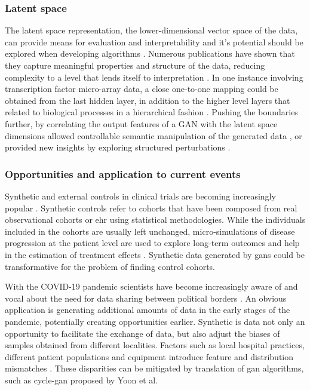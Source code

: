 \subsubsection{Latent space \label{sec:latent-space}}
The latent space representation, the lower-dimensional vector space of the data, can provide means for evaluation and interpretability and it's potential should be explored when developing algorithms \cite{lui2019-latent}. Numerous publications have shown that they capture meaningful properties and structure of the data, reducing complexity to a level that lends itself to interpretation \cite{Way2020, Koumakis2020}. In one instance involving transcription factor micro-array data, a close one-to-one mapping could be obtained from the last hidden layer, in addition to the higher level layers that related to biological processes in a hierarchical fashion \cite{chen2016-latentyeast}. Pushing the boundaries further, by correlating the output features of a GAN with the latent space dimensions allowed controllable semantic manipulation of the generated data \cite{Wang2020latent,Ding2020latent,Li2020latent}, or provided new insights by exploring structured perturbations \cite{lui2019-latent}.

\subsubsection{Opportunities and application to current events}
Synthetic and external controls in clinical trials are becoming increasingly popular \cite{Thorlund2020}. Synthetic controls refer to cohorts that have been composed from real observational cohorts or \gls{ehr} using statistical methodologies. While the individuals included in the cohorts are usually left unchanged, micro-simulations of disease progression at the patient level are used to explore long-term outcomes and help in the estimation of treatment effects \cite{Thorlund2020, Etzioni2002}. Synthetic data generated by \glspl{gan} could be transformative for the problem of finding control cohorts.\par
With the COVID-19 pandemic scientists have become increasingly aware of and vocal about the need for data sharing between political borders \cite{Cosgriff_2020,Becker_2020,McLennan_2020}. An obvious application is generating additional amounts of data in the early stages of the pandemic, potentially creating opportunities earlier. Synthetic is data not only an opportunity to facilitate the exchange of data, but also adjust the biases of samples obtained from different localities. Factors such as local hospital practices, different patient populations and equipment introduce feature and distribution mismatches \cite{Ghassemi2020}. These disparities can be mitigated by translation of \gls{gan} algorithms, such as \gls{cycle-gan} proposed by Yoon et al.